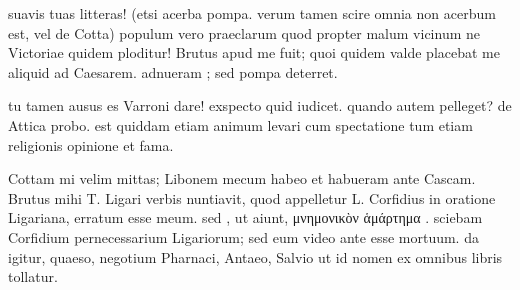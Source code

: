 


 suavis tuas litteras! (etsi acerba pompa. verum tamen scire omnia non acerbum est, vel de Cotta) populum vero praeclarum quod propter malum vicinum ne Victoriae quidem ploditur! Brutus apud me fuit; quoi quidem valde placebat me aliquid ad Caesarem. adnueram ; sed pompa deterret.

 tu tamen ausus es Varroni dare! exspecto quid iudicet. quando autem pelleget? de Attica probo. est quiddam etiam animum levari cum spectatione tum etiam religionis opinione et fama.

 Cottam mi velim mittas; Libonem mecum habeo et habueram ante Cascam. Brutus mihi T. Ligari verbis nuntiavit, quod appelletur L. Corfidius in oratione Ligariana, erratum esse meum. sed , ut aiunt, μνημονικὸν ἁμάρτημα . sciebam Corfidium pernecessarium Ligariorum; sed eum video ante esse mortuum. da igitur, quaeso, negotium Pharnaci, Antaeo, Salvio ut id nomen ex omnibus libris tollatur.
